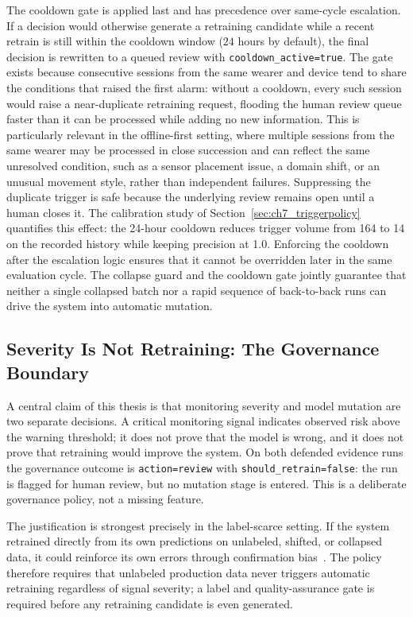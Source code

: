 The cooldown gate is applied last and has precedence over same-cycle escalation. If a decision would otherwise generate a retraining candidate while a recent retrain is still within the cooldown window (\(24\) hours by default), the final decision is rewritten to a queued review with \texttt{cooldown\_active=true}. The gate exists because consecutive sessions from the same wearer and device tend to share the conditions that raised the first alarm: without a cooldown, every such session would raise a near-duplicate retraining request, flooding the human review queue faster than it can be processed while adding no new information. This is particularly relevant in the offline-first setting, where multiple sessions from the same wearer may be processed in close succession and can reflect the same unresolved condition, such as a sensor placement issue, a domain shift, or an unusual movement style, rather than independent failures. Suppressing the duplicate trigger is safe because the underlying review remains open until a human closes it. The calibration study of Section~\ref{sec:ch7_triggerpolicy} quantifies this effect: the 24-hour cooldown reduces trigger volume from 164 to 14 on the recorded history while keeping precision at 1.0. Enforcing the cooldown after the escalation logic ensures that it cannot be overridden later in the same evaluation cycle. The collapse guard and the cooldown gate jointly guarantee that neither a single collapsed batch nor a rapid sequence of back-to-back runs can drive the system into automatic mutation.

\subsection{Severity Is Not Retraining: The Governance Boundary}
\label{sec:governance_boundary}

A central claim of this thesis is that monitoring severity and model mutation are two separate
decisions. A critical monitoring signal indicates observed risk above the warning threshold; it does
not prove that the model is wrong, and it does not prove that retraining would improve the system. On
both defended evidence runs the governance outcome is \texttt{action=review} with
\texttt{should\_retrain=false}: the run is flagged for human review, but no mutation stage is entered.
This is a deliberate governance policy, not a missing feature.

The justification is strongest precisely in the label-scarce setting. If the system retrained directly
from its own predictions on unlabeled, shifted, or collapsed data, it could reinforce its own errors
through confirmation bias~\cite{lee2013pseudolabel,arazo2020pseudolabel}. The policy therefore
requires that unlabeled production data never triggers automatic retraining regardless of signal
severity; a label and quality-assurance gate is required before any retraining candidate is even
generated.

